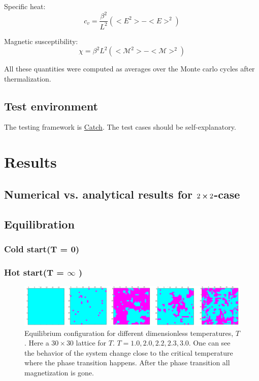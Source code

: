 \documentclass[11pt,a4paper,english]{article}
\numberwithin{equation}{section}
\newcommand{\magM}{\mathcal{M}}
\begin{document}
Specific heat:
\begin{equation}
c_v = \frac{\beta^2}{L^2}(<E^2> - <E>^2)
\end{equation}

Magnetic susceptibility:
\begin{equation}
\chi = \beta^2 L^2 (<\magM^2> - <\magM>^2)
\end{equation}

All these quantities were computed as averages over the Monte carlo cycles after thermalization. 

\subsection{Test environment}

The testing framework is \href{https://github.com/philsquared/Catch}{Catch}.
The test cases should be self-explanatory.


\section{Results}

\subsection{Numerical vs. analytical results for $2\cross2$-case}

\subsection{Equilibration}

\subsubsection{Cold start(T = 0)}

\subsubsection{Hot start(T = $\infty$ )}


\begin{figure}[H]
\centering
\includegraphics[scale=0.10]{pics/equilibrium_different_temperatures.png}
\caption{Equilibrium configuration for different dimensionless temperatures, $T$. Here a $30 \times 30$ lattice for $T$.  $T=1.0, 2.0, 2.2, 2.3, 3.0$. One can see the behavior of the system change close to the critical temperature where the phase transition happens. After the phase transition all magnetization is gone.} 
\label{fig:spin_neighbours}
\end{figure}
\end{document}
